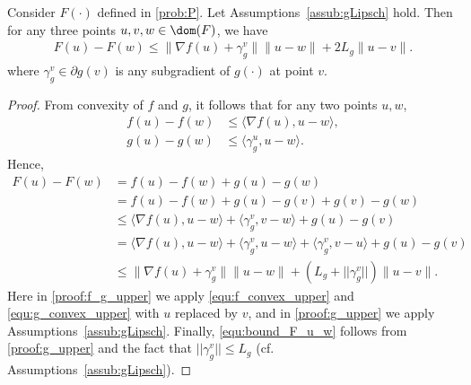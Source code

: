 \documentclass[11pt]{article}
\numberwithin{equation}{section}
\begin{document}
\begin{lemma}
Consider $F(\cdot)$ defined in \eqref{prob:P}. Let Assumptions~\ref{assub:gLipsch} hold. Then for any three points $u, v, w \in \dom(F)$, we have
\begin{align}
	\label{equ:bound_F_u_w}
    F(u) - F(w) 
    \leq 
    \|\nabla f(u)+\gamma_g^v\|\|u-w\| + 2L_g \|u-v\|.
\end{align}
where $\gamma_g^v \in \partial g(v)$ is any subgradient of $g(\cdot)$ at point $v$.
\end{lemma}
\begin{proof}
	From convexity of $f$ and $g$, it follows that for any two points $u, w$,
	\begin{align}
		\label{equ:f_convex_upper}
	    f(u) - f(w) &\leq \langle \nabla f(u), u-w \rangle, \\
	    \label{equ:g_convex_upper}
	    g(u) - g(w) &\leq \langle \gamma_g^u, u-w \rangle.
	\end{align}
	Hence,
	\begin{align}
	    \nonumber
	    F(u)-F(w)
	    &=f(u)-f(w)+g(u)-g(w) \\
	    \nonumber
	    &=f(u)-f(w)+g(u)-g(v)+g(v)-g(w) \\
	    \label{proof:f_g_upper}
	    &\leq \langle \nabla f(u), u-w \rangle
	    +\langle \gamma_g^v, v-w \rangle 
	    +g(u)-g(v) \\
	    \nonumber
	    &= \langle \nabla f(u), u-w \rangle
	    +\langle \gamma_g^v, u-w \rangle 
	    +\langle \gamma_g^v, v-u \rangle 
	    +g(u)-g(v)\\
	    \label{proof:g_upper}
	    &\leq \|\nabla f(u)+\gamma_g^v\|\|u-w\| 
	    + (L_g + ||\gamma_g^v||) \|u-v\|. 
	\end{align}
	Here in \eqref{proof:f_g_upper} we apply \eqref{equ:f_convex_upper} and \eqref{equ:g_convex_upper} with $u$ replaced by $v$, and in \eqref{proof:g_upper} we apply Assumptions~\ref{assub:gLipsch}. Finally, \eqref{equ:bound_F_u_w} follows from \eqref{proof:g_upper} and the fact that $||\gamma_g^v|| \leq L_g$ (cf. Assumptions~\ref{assub:gLipsch}).
\end{proof}
\end{document}
